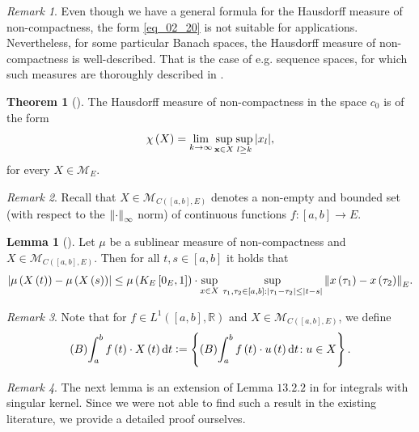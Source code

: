 \documentclass[reqno]{amsart}
\numberwithin{equation}{section}
\theoremstyle{definition}
\newtheorem{lemma}{Lemma}
\newtheorem{theorem}{Theorem}
\theoremstyle{remark}
\newtheorem{remark}{Remark}
\newcommand{\ball}[3]{K_{#1}\sbr{#2,#3}}
\newcommand{\Bint}[3]{\br{B}\!\displaystyle\int_{#1}^{#2}{#3}}
\newcommand{\br}[1]{\left(#1\right)}
\newcommand{\bx}{\mathbf{x}}
\newcommand{\C}[2]{C\br{#1,#2}}
\newcommand{\cbr}[1]{\left\{#1\right\}}
\newcommand{\defeq}{\vcentcolon=}
\newcommand{\dt}{\mathrm{d}t}
\newcommand{\fM}{\mathcal{M}}
\newcommand{\LOne}[2]{L^1\br{#1,#2}}
\newcommand{\R}{\mathbb{R}}
\newcommand{\sbr}[1]{\left[#1\right]}
\newcommand{\st}{\!:}
\begin{document}
	\begin{remark}
		Even though we have a general formula for the Hausdorff measure of non-compactness, the form \eqref{eq_02_20} is not suitable for applications. Nevertheless, for some particular Banach spaces, the Hausdorff measure of non-compactness is well-described. That is the case of e.g. sequence spaces, for which such measures are thoroughly described in \cite{Banas_book_sequences}.
	\end{remark}
	\begin{theorem}[]\label{thm_13}
		The Hausdorff measure of non-compactness in the space $c_0$ is of the form
		\begin{equation}\label{eq_02_21}
			\chi\br{X}=\lim_{k\rightarrow\infty}\sup_{\bx\in{X}}\sup_{l\geq{k}}\abs{x_l},
		\end{equation}
		for every $X\in\fM_E$.
	\end{theorem}
	\begin{remark}
		Recall that $X\in\fM_{\C{\sbr{a,b}}{E}}$ denotes a non-empty and bounded set (with respect to the $\norm{\cdot}_{\infty}$ norm) of continuous functions $f\st\sbr{a,b}\rightarrow{E}$.
	\end{remark}
	\begin{lemma}[]\label{lm_02}
		Let $\mu$ be a sublinear measure of non-compactness and $X\in\fM_{\C{\sbr{a,b}}{E}}$. Then for all $t,s\in\sbr{a,b}$ it holds that
		\begin{equation*}
			\abs{\mu\br{X\br{t}}-\mu\br{X\br{s}}}\leq\mu\br{\ball{E}{0_E}{1}}\cdot\sup_{x\in{X}}\,\sup_{\tau_1,\tau_2\in\sbr{a,b}\,\st\abs{\tau_1-\tau_2}\leq\abs{t-s}}\norm{x\br{\tau_1}-x\br{\tau_2}}_E.
		\end{equation*}
	\end{lemma}
	\begin{remark}
		Note that for $f\in\LOne{\sbr{a,b}}{\R}$ and $X\in\fM_{\C{\sbr{a,b}}{E}}$, we define
		\begin{equation*}
			\Bint{a}{b}{f\br{t}\cdot{X}\br{t}\dt}\defeq\cbr{\Bint{a}{b}{f\br{t}\cdot{u}\br{t}\dt}\st{u}\in{X}}.
		\end{equation*}
	\end{remark}
	\begin{remark}
		The next lemma is an extension of Lemma $13.2.2$ in \cite{Banas_book} for integrals with singular kernel. Since we were not able to find such a result in the existing literature, we provide a detailed proof ourselves.
	\end{remark}
\end{document}
